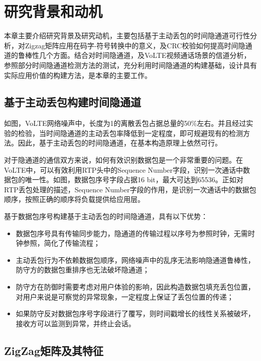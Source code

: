 \section{研究背景和动机}
\label{chap:zigzag:motivation}

本章主要介绍研究背景及研究动机，主要包括基于主动丢包的时间隐通道可行性分析，对Zigzag矩阵应用在码字-符号转换中的意义，及CRC校验如何提高时间隐通道的鲁棒性几个方面。结合对时间隐通道，及VoLTE视频通话场景的信道分析，参照部分时间隐通道检测方法的测试，充分利用时间隐通道的构建基础，设计具有实际应用价值的构建方法，是本章的主要工作。

\subsection{基于主动丢包构建时间隐通道}
\label{chap:zigzag:motivation:dropout}
如图，VoLTE网络噪声中，长度为1的离散丢包占据总量的50\%左右。并且经过实验的检验，当时间隐通道的主动丢包率降低到一定程度，即可规避现有的检测方法。因此，基于主动丢包的时间隐通道，在基本构造原理上依然可行。

对于隐通道的通信双方来说，如何有效识别数据包是一个非常重要的问题。在VoLTE中，可以有效利用RTP头中的Sequence Number字段，识别一次通话中数据包的唯一性。如图，数据包序号字段占据16 bit，最大可达到65536。正如对RTP丢包处理的描述，Sequence Number字段的作用，是识别一次通话中的数据包顺序，按照正确的顺序将负载提供给应用层。

基于数据包序号构建基于主动丢包的时间隐通道，具有以下优势：
\begin{itemize}
    \item 数据包序号具有传输同步能力，隐通道的传输过程以序号为参照时钟，无需时钟参照，简化了传输流程；
    \item 主动丢包行为不依赖数据包顺序，网络噪声中的乱序无法影响隐通道鲁棒性，防守方的数据包重排序也无法破坏隐通道；
    \item 防守方在防御时需要考虑对用户体验的影响，因此构造数据包填充丢包位置，对用户来说是可察觉的异常现象，一定程度上保证了丢包位置的传递；
    \item 如果防守反对数据包序号字段进行了覆写，则时间戳增长的线性关系被破坏，接收方可以监测到异常，并终止会话。
\end{itemize}

\subsection{ZigZag矩阵及其特征}
\label{chap:zigzag:motivation:zigzag}


